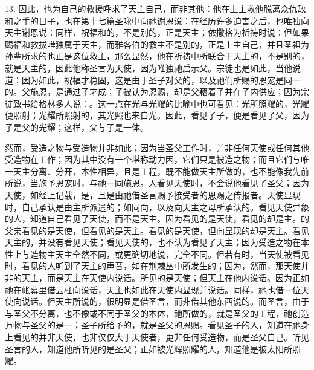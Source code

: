 13. 因此，也为自己的救援呼求了天主自己，而非其他：他在上主救他脱离众仇敌和之手的日子，也在第十七篇圣咏中向祂谢恩说：在经历许多迫害之后，也唯独向天主谢恩说：同样，祝福和的，不是别的，正是天主；依撒格为祈祷时说：但如果赐福和救拔唯独属于天主，而雅各伯的救主不是别的，正是上主自己，并且圣祖为孙辈所求的也正是这位救主，那么显然，他在祈祷中所联合于天主的，不是别的，就是天主的，因此他称圣言为天使，因为唯独祂启示父。宗徒也是如此，当他说道：因为如此，祝福才稳固，这是由于圣子对父的，以及祂们所赐的恩宠是同一的。父施恩，是通过子才成；子被认为恩赐，却是父藉着子并在子内供应；因为宗徒致书给格林多人说：。这一点在光与光耀的比喻中也可看见：光所照耀的，光耀便照射；光耀所照射的，其光照也来自光。因此，看见了子，便是看见了父，因为子是父的光耀；这样，父与子是一体。\par

然而，受造之物与受造物并非如此；因为当圣父工作时，并非任何天使或任何其他受造物在工作；因为其中没有一个堪称动力因，它们只是被造之物；而且它们与唯一天主分离、分开，本性相异，且是工程，既不能做天主所做的，也不能像我先前所说，当施予恩宠时，与祂一同施恩。人看见天使时，不会说他看见了圣父；因为天使，如经上记载，是，且是由祂借圣言赐予接受者的恩赐之传报者。天使显现时，自己承认是由主所派遣的；如同向，以及向天主之母所承认的。看见天使异象的人，知道自己看见了天使，而不是天主。因为看见的是天使，看见的却是主。的父亲看见的是天使，但看见的是天主。看见的是天使，但向显现的却是天主。看见天主的，并没有看见天使；看见天使的，也不认为看见了天主；因为受造之物在本性上与造物主天主全然不同，或更确切地说，完全不同。但若有时，当天使被看见时，看见的人听到了天主的声音，如在荆棘丛中所发生的；因为，然而，那天使并非的天主，而是天主在天使内说话。所见的是天使；但天主在他内说话。因为正如祂在帐幕里借云柱向说话，天主也如此在天使内显现并说话。同样，祂也借一位天使向说话。但天主所说的，很明显是借圣言，而非借其他东西说的。而圣言，由于与圣父不分离，也不像或不同于圣父的本体，祂所做的，就是圣父的工程，祂创造万物与圣父的是一；圣子所给予的，就是圣父的恩赐。看见圣子的人，知道在祂身上看见的并非天使，也非仅仅大于天使者，更非任何受造物，而是圣父自己。听见圣言的人，知道他所听见的是圣父；正如被光辉照耀的人，知道他是被太阳所照耀。\par

